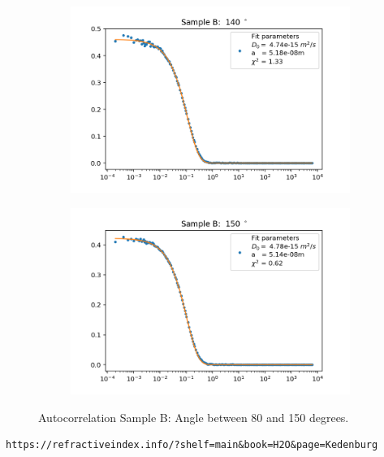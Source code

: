 \documentclass[]{article}
\begin{document}
\begin{figure}[!h]
\medskip
\begin{subfigure}{0.48\textwidth}
\includegraphics[width=\linewidth]{Plots/B/140.png}
\end{subfigure}
\begin{subfigure}[c]{0.48\linewidth}
\includegraphics[width=\linewidth]{Plots/B/150.png}
\end{subfigure}

\caption{Autocorrelation Sample B: Angle between 80 and 150 degrees.}
\end{figure}


\newpage
\begin{thebibliography}{}

 \begin{verbatim}
https://refractiveindex.info/?shelf=main&book=H2O&page=Kedenburg
\end{verbatim}

\end{thebibliography}
\end{document}
